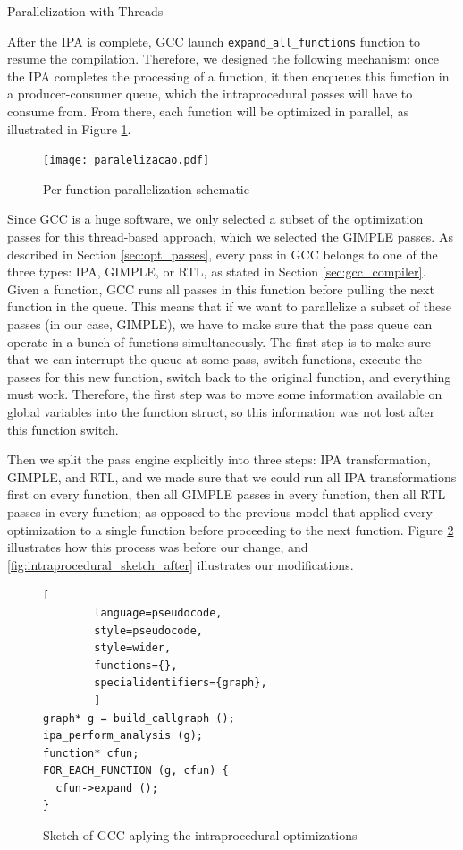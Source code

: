 \begin{section}{Parallelization with Threads}\label{sec:threads}

After the IPA is complete, GCC launch \texttt{expand\_all\_functions} function
to resume the compilation. Therefore, we designed the following mechanism: once
the IPA completes the processing of a function, it then enqueues this function
in a producer-consumer queue, which the intraprocedural passes will have to
consume from. From there, each function will be optimized in parallel, as
illustrated in Figure \ref{fig:paralelizacao}.


\begin{figure}[ht]
 \centering
 \texttt{[image: paralelizacao.pdf]}
 \caption{Per-function parallelization schematic}
 \label{fig:paralelizacao}
\end{figure}

Since GCC is a huge software, we only selected a subset of the optimization
passes for this thread-based approach, which we selected the GIMPLE passes.  As
described in Section \ref{sec:opt_passes}, every pass in GCC belongs to one of
the three types: IPA, GIMPLE, or RTL, as stated in Section
\ref{sec:gcc_compiler}. Given a function, GCC runs all passes in this function
before pulling the next function in the queue. This means that if we want to
parallelize a subset of these passes (in our case, GIMPLE), we have to make
sure that the pass queue can operate in a bunch of functions simultaneously.
The first step is to make sure that we can interrupt the queue at some pass,
switch functions, execute the passes for this new function, switch back to the
original function, and everything must work.  Therefore, the first step was to
move some information available on global variables into the function struct,
so this information was not lost after this function switch.

Then we split the pass engine explicitly into three steps: IPA
transformation, GIMPLE, and RTL, and we made sure that we could run all IPA
transformations first on every function, then all GIMPLE passes in every
function, then all RTL passes in every function; as opposed to the previous
model that applied every optimization to a single function before proceeding to
the next function. Figure \ref{fig:intraprocedural_sketch} illustrates how this
process was before our change, and \ref{fig:intraprocedural_sketch_after}
illustrates our modifications.

\begin{figure}[ht]
	\centering
	\begin{lstlisting}[
		language=pseudocode,
		style=pseudocode,
		style=wider,
		functions={},
		specialidentifiers={graph},
		]
graph* g = build_callgraph ();
ipa_perform_analysis (g);
function* cfun;
FOR_EACH_FUNCTION (g, cfun) {
  cfun->expand ();
}
	\end{lstlisting}
\caption{Sketch of GCC aplying the intraprocedural optimizations}
\label{fig:intraprocedural_sketch}
\end{figure}



\end{section}
